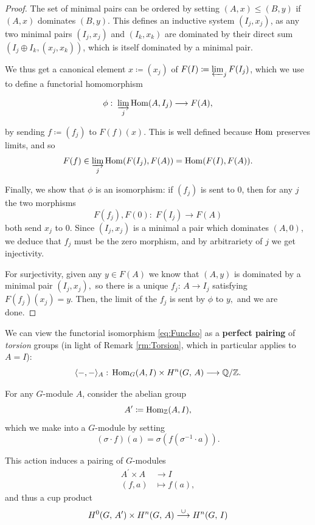 \documentclass[a4paper, oneside]{memoir}
\begin{document}
\begin{proof}
	The set of minimal pairs can be ordered by setting \((A,x)\leq (B,y)\) if \((A,x)\) dominates \((B,y)\). This defines an inductive system \((I_j,x_j)\), as any two minimal pairs \((I_j,x_j)\) and \((I_k,x_k)\) are dominated by their direct sum \(\left(I_j\oplus I_k,(x_j,x_k)\right)\), which is itself dominated by a minimal pair.

	We thus get a canonical element \(x\coloneqq (x_j)\) of \(F(I)\coloneqq \varprojlim_j F(I_j)\), which we use to define a functorial homomorphism

	\[
		\phi: \; \varinjlim_j \operatorname{Hom}(A,I_j)\longrightarrow F(A),
	\]

	by sending \(f\coloneqq (f_j)\) to \(F(f)(x)\). This is well defined because \(\operatorname{Hom}\) preserves limits, and so
	\[
		F(f)\in\varinjlim_j{\operatorname{Hom}(F(I_j),F(A))}=\operatorname{Hom}(F(I),F(A)).
	\]

	Finally, we show that \(\phi\) is an isomorphism: if \((f_j)\) is sent to \(0\), then for any \(j\) the two morphisms
	\[
		F(f_j), F(0):\; F(I_j) \to F(A)
	\]
	both send \(x_j\) to \(0.\) Since \((I_j,x_j)\) is a minimal a pair which dominates \((A,0)\), we deduce that \(f_j\) must be the zero morphism, and by arbitrariety of \(j\) we get injectivity.

	For surjectivity, given any \(y\in F(A)\) we know that \((A,y)\) is dominated by a minimal pair \((I_j,x_j),\) so there is a unique \(f_j:\, A\to I_j\) satisfying \(F(f_j)(x_j)=y.\) Then, the limit of the \(f_j\) is sent by \(\phi\) to \(y,\) and we are done.
\end{proof}


\begin{remark}
	We can view the functorial isomorphism \eqref{eq:FuncIso} as a \textbf{perfect pairing} of \textit{torsion} groups (in light of Remark \ref{rm:Torsion}, which in particular applies to $A=I$):
	\[
		\langle-,-\rangle_A:\,\operatorname{Hom}_G(A,I)\times H^{n}( G, \, A )\longrightarrow\mathbb{Q} /\mathbb{Z}.
	\]
\end{remark}

For any \(G\)-module \(A\), consider the abelian group
\[
	A^{\prime}\coloneqq \operatorname{Hom}_{\mathbb{Z}}(A,I),
\]
which we make into a \(G\)-module by setting
\begin{equation}\label{eq:TateTwist}
	(\sigma\cdot f)(a)=\sigma(f(\sigma^{-1}\cdot a)).
\end{equation}

This action induces a pairing of \(G\)-modules
\begin{align*}
	A^\prime\times A & \to I         \\
	(f,a)            & \mapsto f(a),
\end{align*}
and thus a cup product
\[
	H^{0}( G, \, A^\prime )\times H^{n}( G, \, A )\overset{\cup}{\longrightarrow}H^{n}( G, \, I )
\]
\end{document}
